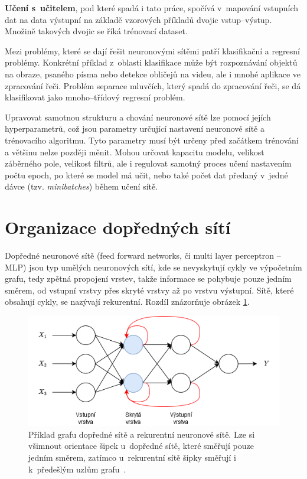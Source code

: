 \textbf{Učení s~učitelem}, pod které spadá i tato práce, spočívá v~mapování vstupních dat na data výstupní na základě vzorových příkladů dvojic vstup--výstup. Množině takových dvojic se říká trénovací dataset.

Mezi problémy, které se dají řešit neuronovými sítěmi patří klasifikační a regresní problémy. Konkrétní příklad z~oblasti klasifikace může být rozpoznávání objektů na obraze, psaného písma nebo detekce obličejů na videu, ale i mnohé aplikace ve zpracování řeči. Problém separace mluvčích, který spadá do zpracování řeči, se dá klasifikovat jako mnoho--třídový regresní problém.

Upravovat samotnou strukturu a chování neuronové sítě lze pomocí jejích hyperparametrů, což jsou parametry určující nastavení neuronové sítě a trénovacího algoritmu. Tyto parametry musí být určeny před začátkem trénování a většinu nelze později měnit. Mohou určovat kapacitu modelu, velikost záběrného pole, velikost filtrů, ale i regulovat samotný proces učení nastavením počtu epoch, po které se model má učit, nebo také počet dat předaný v~jedné dávce (tzv. \textit{minibatches}) během učení sítě.


\section{Organizace dopředných sítí}
Dopředné neuronové sítě (feed forward networks, či multi layer perceptron -- MLP) jsou typ umělých neuronových sítí, kde se nevyskytují cykly ve výpočetním grafu, tedy zpětná propojení vrstev, takže informace se pohybuje pouze jedním směrem, od vstupní vrstvy přes skryté vrstvy až po vrstvu výstupní. Sítě, které obsahují cykly, se nazývají rekurentní. Rozdíl znázorňuje obrázek \ref{fig:netcomparison}.

\begin{figure}[H]
    \centering
    \includegraphics[scale=0.8]{obrazky-figures/feedforward_vs_recurrent.png}
    \caption{\label{fig:netcomparison}Příklad grafu dopředné sítě a rekurentní neuronové sítě. Lze si všimnout orientace šipek u~dopředné sítě, které směřují pouze jedním směrem, zatímco u~rekurentní sítě šipky směřují i k~předešlým uzlům grafu~\cite{FFandRecNN}.}
\end{figure}

